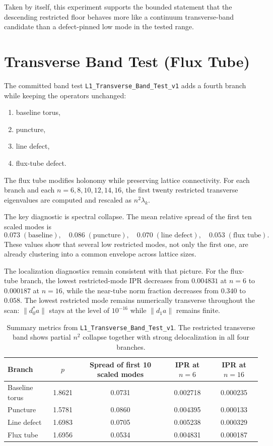 \documentclass[11pt]{article}
\begin{document}
Taken by itself, this experiment supports the bounded statement that the descending restricted floor behaves more like a continuum transverse-band candidate than a defect-pinned low mode in the tested range.

\section{Transverse Band Test (Flux Tube)}
The committed band test \texttt{L1\_Transverse\_Band\_Test\_v1} adds a fourth branch while keeping the operators unchanged:
\begin{enumerate}
\item baseline torus,
\item puncture,
\item line defect,
\item flux-tube defect.
\end{enumerate}
The flux tube modifies holonomy while preserving lattice connectivity. For each branch and each $n = 6, 8, 10, 12, 14, 16$, the first twenty restricted transverse eigenvalues are computed and rescaled as $n^2 \lambda_k$.

The key diagnostic is spectral collapse. The mean relative spread of the first ten scaled modes is
\begin{equation}
0.073 \; (\text{baseline}),
\quad
0.086 \; (\text{puncture}),
\quad
0.070 \; (\text{line defect}),
\quad
0.053 \; (\text{flux tube}).
\end{equation}
These values show that several low restricted modes, not only the first one, are already clustering into a common envelope across lattice sizes.

The localization diagnostics remain consistent with that picture. For the flux-tube branch, the lowest restricted-mode IPR decreases from $0.004831$ at $n=6$ to $0.000187$ at $n=16$, while the near-tube norm fraction decreases from $0.340$ to $0.058$. The lowest restricted mode remains numerically transverse throughout the scan: $\|d_0^* a\|$ stays at the level of $10^{-16}$ while $\|d_1 a\|$ remains finite.

\begin{table}[t]
\centering
\begin{tabular}{lcccc}
\toprule
Branch & $p$ & Spread of first 10 scaled modes & IPR at $n=6$ & IPR at $n=16$ \\
\midrule
Baseline torus & 1.8621 & 0.0731 & 0.002718 & 0.000235 \\
Puncture & 1.5781 & 0.0860 & 0.004395 & 0.000133 \\
Line defect & 1.6983 & 0.0705 & 0.005238 & 0.000329 \\
Flux tube & 1.6956 & 0.0534 & 0.004831 & 0.000187 \\
\bottomrule
\end{tabular}
\caption{Summary metrics from \texttt{L1\_Transverse\_Band\_Test\_v1}. The restricted transverse band shows partial $n^2$ collapse together with strong delocalization in all four branches.}
\label{tab:band-metrics}
\end{table}
\end{document}
